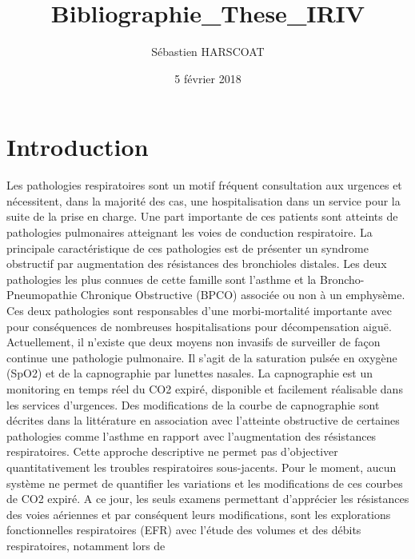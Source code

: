 \documentclass[12pt,]{article}
\title{Bibliographie\_These\_IRIV}
\author{Sébastien HARSCOAT}
\date{5 février 2018}
\begin{document}
\maketitle

{
\setcounter{tocdepth}{2}
\tableofcontents
}
\pagebreak

\listoffigures

\pagebreak

\listoftables

\pagebreak

\hypertarget{introduction}{%
\section{Introduction}\label{introduction}}

Les pathologies respiratoires sont un motif fréquent consultation aux
urgences et nécessitent, dans la majorité des cas, une hospitalisation
dans un service pour la suite de la prise en charge. Une part importante
de ces patients sont atteints de pathologies pulmonaires atteignant les
voies de conduction respiratoire. La principale caractéristique de ces
pathologies est de présenter un syndrome obstructif par augmentation des
résistances des bronchioles distales. Les deux pathologies les plus
connues de cette famille sont l'asthme et la Broncho-Pneumopathie
Chronique Obstructive (BPCO) associée ou non à un emphysème. Ces deux
pathologies sont responsables d'une morbi-mortalité importante avec pour
conséquences de nombreuses hospitalisations pour décompensation aiguë.
Actuellement, il n'existe que deux moyens non invasifs de surveiller de
façon continue une pathologie pulmonaire. Il s'agit de la saturation
pulsée en oxygène (SpO2) et de la capnographie par lunettes nasales. La
capnographie est un monitoring en temps réel du CO2 expiré, disponible
et facilement réalisable dans les services d'urgences. Des modifications
de la courbe de capnographie sont décrites dans la littérature en
association avec l'atteinte obstructive de certaines pathologies comme
l'asthme en rapport avec l'augmentation des résistances respiratoires.
Cette approche descriptive ne permet pas d'objectiver quantitativement
les troubles respiratoires sous-jacents. Pour le moment, aucun système
ne permet de quantifier les variations et les modifications de ces
courbes de CO2 expiré. A ce jour, les seuls examens permettant
d'apprécier les résistances des voies aériennes et par conséquent leurs
modifications, sont les explorations fonctionnelles respiratoires (EFR)
avec l'étude des volumes et des débits respiratoires, notamment lors de
\end{document}
